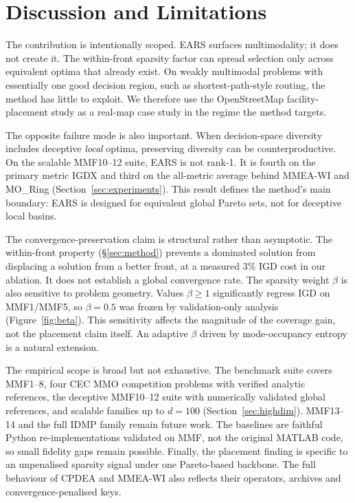 \section{Discussion and Limitations}
\label{sec:limitations}
The contribution is intentionally scoped. EARS surfaces multimodality; it does not create it.
The within-front sparsity factor can spread selection only across equivalent optima that already
exist. On weakly multimodal problems with essentially one good decision region, such as
shortest-path-style routing, the method has little to exploit. We therefore use the OpenStreetMap
facility-placement study as a real-map case study in the regime the method targets.

The opposite failure mode is also important. When decision-space diversity includes deceptive
\emph{local} optima, preserving diversity can be counterproductive. On the scalable MMF10--12
suite, EARS is not rank-1. It is fourth on the primary metric IGDX and third on the all-metric
average behind MMEA-WI and MO\_Ring (Section~\ref{sec:experiments}). This result defines the
method's main boundary: EARS is designed for equivalent global Pareto sets, not for deceptive
local basins.

The convergence-preservation claim is structural rather than asymptotic. The within-front
property (\S\ref{sec:method}) prevents a dominated solution from displacing a solution from a
better front, at a measured $3\%$ IGD cost in our ablation. It does not establish a global
convergence rate. The sparsity weight $\beta$ is also sensitive to problem geometry. Values
$\beta{\ge}1$ significantly regress IGD on MMF1/MMF5, so $\beta=0.5$ was frozen by
validation-only analysis (Figure~\ref{fig:beta}). This sensitivity affects the magnitude of the
coverage gain, not the placement claim itself. An adaptive $\beta$ driven by mode-occupancy
entropy is a natural extension.

The empirical scope is broad but not exhaustive. The benchmark suite covers MMF1--8, four CEC MMO
competition problems with verified analytic references, the deceptive MMF10--12 suite with
numerically validated global references, and scalable families up to $d{=}100$
(Section~\ref{sec:highdim}). MMF13--14 and the full IDMP family remain future work. The baselines
are faithful Python re-implementations validated on MMF, not the original MATLAB code, so small
fidelity gaps remain possible. Finally, the placement finding is specific to an unpenalised
sparsity signal under one Pareto-based backbone. The full behaviour of CPDEA and MMEA-WI also
reflects their operators, archives and convergence-penalised keys.

